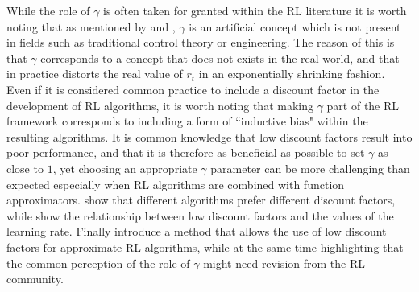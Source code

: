 While the role of $\gamma$ is often taken for granted within the RL literature it is worth noting that as mentioned by \citet{van2011insights} and \citet{schmidhuber2019reinforcement}, $\gamma$ is an artificial concept which is not present in fields such as traditional control theory or engineering. The reason of this is that $\gamma$ corresponds to a concept that does not exists in the real world, and that in practice distorts the real value of $r_t$ in an exponentially shrinking fashion. Even if it is considered common practice to include a discount factor in the development of RL algorithms, it is worth noting that making $\gamma$ part of the RL framework corresponds to including a form of ``inductive bias" within the resulting algorithms. It is common knowledge that low discount factors result into poor performance, and that it is therefore as beneficial as possible to set $\gamma$ as close to $1$, yet choosing an appropriate $\gamma$ parameter can be more challenging than expected especially when RL algorithms are combined with function approximators. \citet{wiering2009qv} show that different algorithms prefer different discount factors, while \citet{franccois2015discount} show the relationship between low discount factors and the values of the learning rate. Finally \citet{van2019using} introduce a method that allows the use of low discount factors for approximate RL algorithms, while at the same time highlighting that the common perception of the role of $\gamma$ might need revision from the RL community.             

